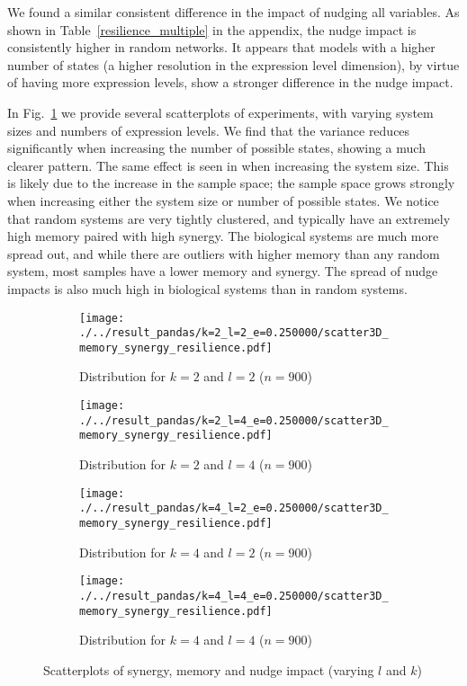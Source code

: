 \documentclass[../main.tex]{subfiles}
\begin{document}
We found a similar consistent difference in the impact of nudging all variables.
As shown in Table~\ref{resilience_multiple} in the appendix, the nudge impact is consistently higher in random networks.
It appears that models with a higher number of states (a higher resolution in the expression level dimension), by virtue of having more expression levels, show a stronger difference in the nudge impact.

In Fig.~\ref{fig:3dscatter} we provide several scatterplots of experiments, with varying system sizes and numbers of expression levels.
We find that the variance reduces significantly when increasing the number of possible states, showing a much clearer pattern.
The same effect is seen in when increasing the system size.
This is likely due to the increase in the sample space; the sample space grows strongly when increasing either the system size or number of possible states.
We notice that random systems are very tightly clustered, and typically have an extremely high memory paired with high synergy.
The biological systems are much more spread out, and while there are outliers with higher memory than any random system, most samples have a lower memory and synergy.
The spread of nudge impacts is also much high in biological systems than in random systems.

\begin{figure}[H]
    \centering
    \begin{subfigure}[b]{0.45\textwidth}
        \texttt{[image: ./../result\_pandas/k=2\_l=2\_e=0.250000/scatter3D\_memory\_synergy\_resilience.pdf]}
        \caption{Distribution for $k=2$ and $l=2$ ($n=900$)}
    \end{subfigure}
    \begin{subfigure}[b]{0.45\textwidth}
        \texttt{[image: ./../result\_pandas/k=2\_l=4\_e=0.250000/scatter3D\_memory\_synergy\_resilience.pdf]}
        \caption{Distribution for $k=2$ and $l=4$ ($n=900$)}
    \end{subfigure}
\bigskip
    \begin{subfigure}[b]{0.45\textwidth}
        \texttt{[image: ./../result\_pandas/k=4\_l=2\_e=0.250000/scatter3D\_memory\_synergy\_resilience.pdf]}
        \caption{Distribution for $k=4$ and $l=2$ ($n=900$)}
    \end{subfigure}
    \begin{subfigure}[b]{0.45\textwidth}
        \texttt{[image: ./../result\_pandas/k=4\_l=4\_e=0.250000/scatter3D\_memory\_synergy\_resilience.pdf]}
        \caption{Distribution for $k=4$ and $l=4$ ($n=900$)}
    \end{subfigure}
    \caption{Scatterplots of synergy, memory and nudge impact (varying $l$ and $k$)}
    \label{fig:3dscatter}
\end{figure}
\end{document}

